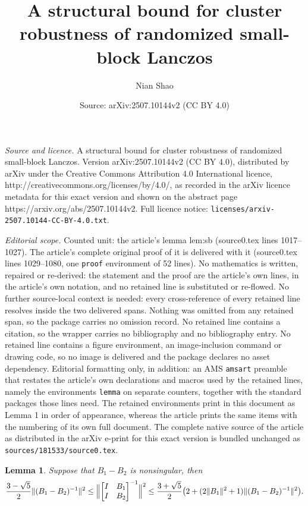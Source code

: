 \documentclass[10pt,a4paper]{amsart}
\title{A structural bound for cluster robustness of randomized small-block Lanczos}
\author{Nian Shao}
\date{Source: arXiv:2507.10144v2 (CC BY 4.0)}
\newtheorem{lemma}{Lemma}
\providecommand{\Bignorm}[1]{\Bigl\lVert#1\Bigr\rVert}
\providecommand{\norm}[1]{\lVert#1\rVert}
\begin{document}
\maketitle

\noindent\emph{Source and licence.} A structural bound for cluster robustness of randomized small-block Lanczos. Version arXiv:2507.10144v2 (CC BY 4.0), distributed by arXiv under the Creative Commons Attribution 4.0 International licence, http://creativecommons.org/licenses/by/4.0/, as recorded in the arXiv licence metadata for this exact version and shown on the abstract page https://arxiv.org/abs/2507.10144v2. Full licence notice: \texttt{licenses/arxiv-2507.10144-CC-BY-4.0.txt}.\par\smallskip

\noindent\textit{Editorial scope.} Counted unit: the article's lemma lem:sb (source0.tex lines 1017--1027). The article's complete original proof of it is delivered with it (source0.tex lines 1029--1080, one \texttt{proof} environment of 52 lines). No mathematics is written, repaired or re-derived: the statement and the proof are the article's own lines, in the article's own notation, and no retained line is substituted or re-flowed.  No further source-local context is needed: every cross-reference of every retained line resolves inside the two delivered spans.  Nothing was omitted from any retained span, so the package carries no omission record.  No retained line contains a citation, so the wrapper carries no bibliography and no bibliography entry.  No retained line contains a figure environment, an image-inclusion command or drawing code, so no image is delivered and the package declares no asset dependency.  Editorial formatting only, in addition: an AMS \texttt{amsart} preamble that restates the article's own declarations and macros used by the retained lines, namely the environments \texttt{lemma} on separate counters, together with the standard packages those lines need.  The retained environments print in this document as Lemma 1 in order of appearance, whereas the article prints the same items with the numbering of its own full document.  The complete native source of the article as distributed in the arXiv e-print for this exact version is bundled unchanged as \texttt{sources/181533/source0.tex}.
\begin{lemma}
    \label{lem:sb}
    Suppose that $B_{1}-B_{2}$ is nonsingular, then 
    \begin{equation*}
        \frac{3-\sqrt{5}}{2}\norm{(B_{1}-B_{2})^{-1}}^{2}\leq 
        \Bignorm{\begin{bmatrix}
        I & B_{1} \\ 
        I & B_{2}
    \end{bmatrix}^{-1}}^{2} \leq \frac{3+\sqrt{5}}{2}\bigl(2+(2\norm{B_{1}}^{2}+1)\norm{(B_{1}-B_{2})^{-1}}^{2}\bigr).
    \end{equation*}
\end{lemma}
\end{document}
